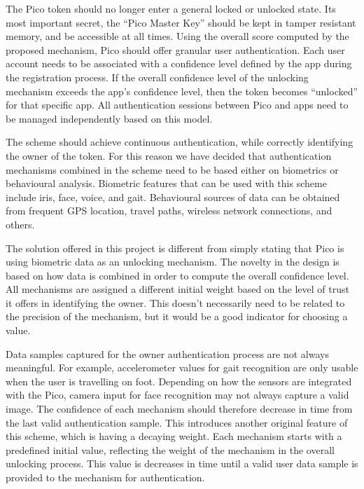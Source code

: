 The Pico token should no longer enter a general locked or unlocked state. Its most important secret, the ``Pico Master Key'' should be kept in tamper resistant memory, and be accessible at all times. Using the overall score computed by the proposed mechanism, Pico should offer granular user authentication. Each user account needs to be associated with a confidence level defined by the app during the registration process. If the overall confidence level of the unlocking mechanism exceeds the app's confidence level, then the token becomes ``unlocked'' for that specific app. All authentication sessions between Pico and apps need to be managed independently based on this model.

The scheme should achieve continuous authentication, while correctly identifying the owner of the token. For this reason we have decided that authentication mechanisms combined in the scheme need to be based either on biometrics or behavioural analysis. Biometric features that can be used with this scheme include iris, face, voice, and gait. Behavioural sources of data can be obtained from frequent GPS location, travel paths, wireless network connections, and others.

The solution offered in this project is different from simply stating that Pico is using biometric data as an unlocking mechanism. The novelty in the design is based on how data is combined in order to compute the overall confidence level. All mechanisms are assigned a different initial weight based on the level of trust it offers in identifying the owner. This doesn't necessarily need to be related to the precision of the mechanism, but it would be a good indicator for choosing a value.

Data samples captured for the owner authentication process are not always meaningful. For example, accelerometer values for gait recognition are only usable when the user is travelling on foot. Depending on how the sensors are integrated with the Pico, camera input for face recognition may not always capture a valid image. The confidence of each mechanism should therefore decrease in time from the last valid authentication sample. This introduces another original feature of this scheme, which is having a decaying weight. Each mechanism starts with a predefined initial value, reflecting the weight of the mechanism in the overall unlocking process. This value is decreases in time until a valid user data sample is provided to the mechanism for authentication. 

